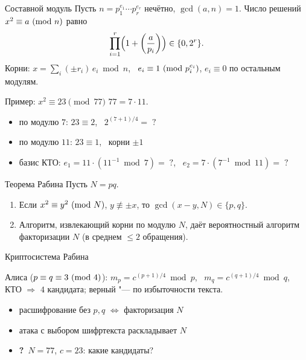 \documentclass{ca-slides}
\begin{document}
\begin{theoremframe}{Составной модуль}
  Пусть $n = p_1^{e_1} \cdots p_r^{e_r}$ нечётно, $\gcd(a, n) = 1$. Число решений
  $x^2 \equiv a \ (\mathrm{mod}\ n)$ равно
  \[
    \prod_{i=1}^r \Bigl(1 + \left(\frac{a}{p_i}\right)\Bigr) \in \{0, 2^r\}.
  \]
  Корни: $x = \sum_i (\pm r_i)\, e_i \bmod n$, \ $e_i \equiv 1 \ (\mathrm{mod}\ p_i^{e_i})$,
  $e_i \equiv 0$ по остальным модулям.
\end{theoremframe}

\begin{canvasframe}{Пример: $x^2 \equiv 23 \pmod{77}$}
  $77 = 7 \cdot 11$.
  \begin{itemize}
    \item по модулю $7$: $23 \equiv 2$, \ $2^{(7+1)/4} = \;?$
    \item по модулю $11$: $23 \equiv 1$, \ корни $\pm 1$
    \item базис КТО: $e_1 = 11 \cdot (11^{-1} \bmod 7) = \;?$, \
      $e_2 = 7 \cdot (7^{-1} \bmod 11) = \;?$
  \end{itemize}
  \penspace[0.35\textheight]
\end{canvasframe}

\begin{theoremframe}{Теорема Рабина}
  Пусть $N = pq$.
  \begin{enumerate}
    \item Если $x^2 \equiv y^2 \ (\mathrm{mod}\ N)$, $y \not\equiv \pm x$, то $\gcd(x - y, N) \in \{p, q\}$.
    \item Алгоритм, извлекающий корни по модулю $N$, даёт вероятностный алгоритм
      факторизации $N$ (в среднем $\le 2$ обращения).
  \end{enumerate}
\end{theoremframe}

\begin{canvasframe}{Криптосистема Рабина}
  \centering
  \par\raggedright
  Алиса ($p \equiv q \equiv 3 \ (\mathrm{mod}\ 4)$): $m_p = c^{(p+1)/4} \bmod p$, \ $m_q = c^{(q+1)/4} \bmod q$,
  КТО $\Rightarrow$ $4$ кандидата; верный "--- по избыточности текста.
  \begin{itemize}
    \item расшифрование без $p, q$ $\Leftrightarrow$ факторизация $N$
    \item атака с выбором шифртекста раскладывает $N$
    \item \textcolor{caRed}{\textbf{?}~$N = 77$, $c = 23$: какие кандидаты?}
  \end{itemize}
\end{canvasframe}
\end{document}
